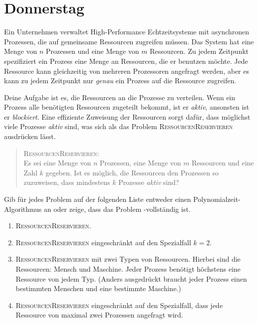 \documentclass{uebung_cs}
\begin{document}
\clearpage
\section*{Donnerstag}

\begin{exercise}[Ressourcenmanagement][\atschool]
    Ein Unternehmen verwaltet High-Performance Echtzeitsysteme mit asynchronen Prozessen, die auf gemeinsame Ressourcen zugreifen müssen. Das System hat eine Menge von $n$ Prozessen und eine Menge von $m$ Ressourcen.
    Zu jedem Zeitpunkt spezifiziert ein Prozess eine Menge an Ressourcen, die er benutzen möchte. Jede Ressource kann gleichzeitig von mehreren Prozessoren angefragt werden, aber es kann zu jedem Zeitpunkt nur \emph{genau} ein Prozess auf die Ressource zugreifen.

    Deine Aufgabe ist es, die Ressourcen an die Prozesse zu verteilen. Wenn ein Prozess alle benötigten Ressourcen zugeteilt bekommt, ist er \textit{aktiv}, ansonsten ist er \textit{blockiert}. Eine effiziente Zuweisung der Ressourcen sorgt dafür, dass möglichst viele Prozesse \textit{aktiv} sind, was sich als das Problem \textsc{RessourcenReservieren} ausdrücken lässt.
    \begin{quote}
        \textsc{RessourcenReservieren}:\\
        Es sei eine Menge von $n$ Prozessen, eine Menge von $m$ Ressourcen und eine Zahl $k$ gegeben. Ist es möglich, die Ressourcen den Prozessen so zuzuweisen, dass mindestens $k$ Prozesse \textit{aktiv} sind?
    \end{quote}

    Gib für jedes Problem auf der folgenden Liste entweder einen Polynomialzeit-Algorithmus an oder zeige, dass das Problem \NP-vollständig ist.
    \begin{enumerate}
        \item \textsc{RessourcenReservieren}.
        \item \textsc{RessourcenReservieren} eingeschränkt auf den Spezialfall $k=2$.
        \item \textsc{RessourcenReservieren} mit zwei Typen von Ressourcen. Hierbei sind die Ressourcen: Mensch und Maschine. Jeder Prozess benötigt höchstens eine Ressource von jedem Typ. (Anders ausgedrückt braucht jeder Prozess einen bestimmten Menschen und eine bestimmte Maschine.)
        \item \textsc{RessourcenReservieren} eingeschränkt auf den Spezialfall, dass jede Ressource von maximal zwei Prozessen angefragt wird.
    \end{enumerate}
\end{exercise}
\end{document}
